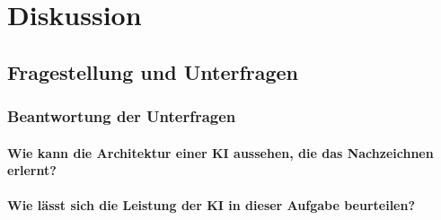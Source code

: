 \chapter{Diskussion}

\section{Fragestellung und Unterfragen}



\subsection{Beantwortung der Unterfragen}

\subsubsection*{Wie kann die Architektur einer KI aussehen, die das Nachzeichnen erlernt?}

\subsubsection*{Wie lässt sich die Leistung der KI in dieser Aufgabe beurteilen?}


